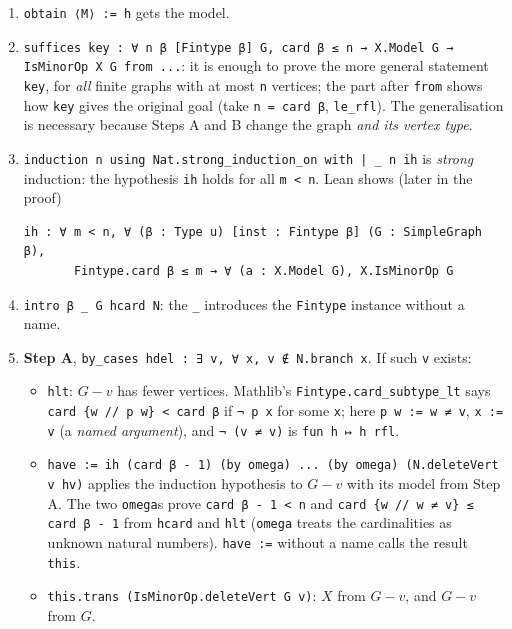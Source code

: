 \documentclass[11pt,a4paper]{article}
\newcommand{\lean}[1]{\texttt{\textcolor{leanink}{#1}}}
\newcommand{\how}{\par\smallskip{\sffamily\bfseries\color{accent}Proof, step by step.}\enspace}
\begin{document}
\how
\begin{enumerate}
\item \lean{obtain ⟨M⟩ := h} gets the model.
\item \lean{suffices key : ∀ n β [Fintype β] G, card β ≤ n → X.Model G → IsMinorOp X G from ...}:
  it is enough to prove the more general statement \lean{key}, for \emph{all} finite graphs with at
  most \lean{n} vertices; the part after \lean{from} shows how \lean{key} gives the original goal
  (take \lean{n = card β}, \lean{le\_\allowbreak{}rfl}). The generalisation is necessary because Steps A and B
  change the graph \emph{and its vertex type}.
\item \lean{induction n using Nat.strong\_\allowbreak{}induction\_\allowbreak{}on with | \_\allowbreak{} n ih} is \emph{strong} induction:
  the hypothesis \lean{ih} holds for all \lean{m < n}. Lean shows (later in the proof)
\begin{leansays}
\begin{Verbatim}[fontsize=\footnotesize]
ih : ∀ m < n, ∀ (β : Type u) [inst : Fintype β] (G : SimpleGraph β),
       Fintype.card β ≤ m → ∀ (a : X.Model G), X.IsMinorOp G
\end{Verbatim}
\end{leansays}
\item \lean{intro β \_\allowbreak{} G hcard N}: the \lean{\_\allowbreak{}} introduces the \lean{Fintype} instance without a name.
\item \textbf{Step A}, \lean{by\_\allowbreak{}cases hdel : ∃ v, ∀ x, v ∉ N.branch x}. If such \lean{v} exists:
  \begin{itemize}
  \item \lean{hlt}: $G - v$ has fewer vertices. Mathlib's \lean{Fintype.card\_\allowbreak{}subtype\_\allowbreak{}lt} says
    \lean{card \{w // p w\} < card β} if \lean{¬ p x} for some \lean{x}; here \lean{p w := w ≠ v},
    \lean{x := v} (a \emph{named argument}), and \lean{¬ (v ≠ v)} is \lean{fun h ↦ h rfl}.
  \item \lean{have := ih (card β - 1) (by omega) ... (by omega) (N.deleteVert v hv)} applies the
    induction hypothesis to $G - v$ with its model from Step A. The two \lean{omega}s prove
    \lean{card β - 1 < n} and \lean{card \{w // w ≠ v\} ≤ card β - 1} from \lean{hcard} and
    \lean{hlt} (\lean{omega} treats the cardinalities as unknown natural numbers).
    \lean{have :=} without a name calls the result \lean{this}.
  \item \lean{this.trans (IsMinorOp.deleteVert G v)}: $X$ from $G - v$, and $G - v$ from $G$.
  \end{itemize}
\end{enumerate}
\end{document}
